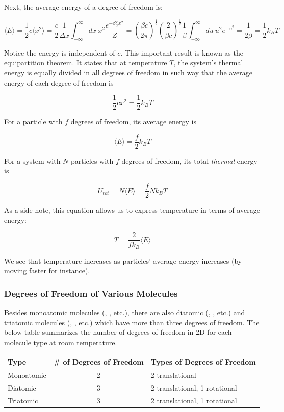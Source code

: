 Next, the average energy of a degree of freedom is:

$$\langle E \rangle=\frac12c\langle x^2 \rangle=\frac{c}{2}\frac{1}{\Delta x}\int_{-\infty}^\infty dx \: x^2 \frac{e^{-\beta\frac{c}{2}x^2}}{Z}=\left(\frac{\beta c}{2\pi}\right)^\frac12\left(\frac{2}{\beta c}\right)^\frac12 \frac{1}{\beta} \int_{-\infty}^\infty du \: u^2 e^{-u^2}=\frac{1}{2\beta}=\frac12k_BT$$

Notice the energy is independent of $c$. This important result is known as the equipartition theorem. It states that at temperature $T$, the system's thermal energy is equally divided in all degrees of freedom in such way that the average energy of each degree of freedom is

$$\frac12cx^2=\frac12k_BT$$

For a particle with $f$ degrees of freedom, its average energy is

$$\langle E \rangle=\frac{f}{2}k_BT$$

For a system with $N$ particles with $f$ degrees of freedom, its total \textit{thermal} energy is

$$U_{tot}=N\langle E \rangle=\frac{f}{2}Nk_BT$$

As a side note, this equation allows us to express temperature in terms of average energy:

$$T=\frac{2}{fk_B}\langle E \rangle$$

We see that temperature increases as particles' average energy increases (by moving faster for instance).

\subsubsection{Degrees of Freedom of Various Molecules}

Besides monoatomic molecules (, , etc.), there are also diatomic (, , etc.) and triatomic molecules (, , etc.) which have more than three degrees of freedom. The below table summarizes the number of degrees of freedom in 2D for each molecule type at room temperature.

\begin{center}
	\begin{tabular}{|l|c|l|}
		\hline
		Type & \# of Degrees of Freedom & Types of Degrees of Freedom \\
		\hline
		Monoatomic & 2 & 2 translational \\
		\hline
		Diatomic & 3 & 2 translational, 1 rotational \\
		\hline
		Triatomic & 3 & 2 translational, 1 rotational \\
		\hline
	\end{tabular}
\end{center}

